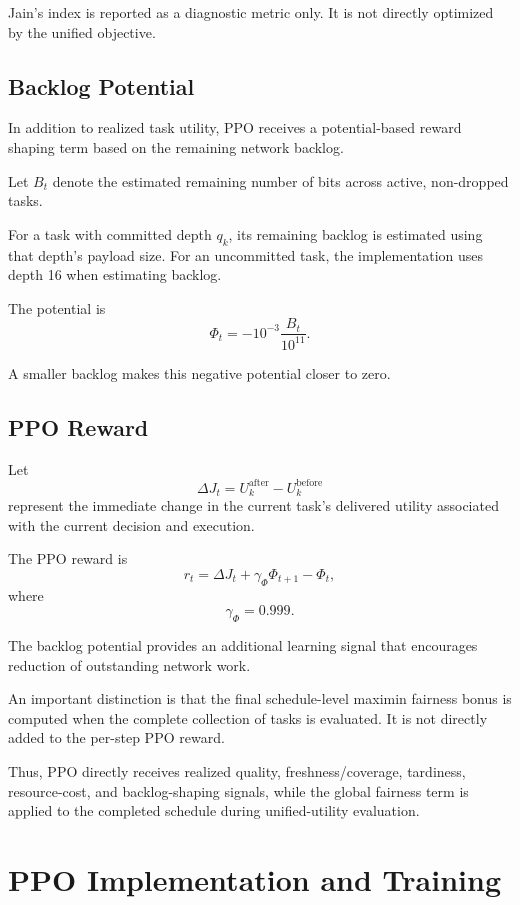 \documentclass[11pt]{article}
\begin{document}
Jain's index is reported as a diagnostic metric only. It is not directly
optimized by the unified objective.


\subsection{Backlog Potential}

In addition to realized task utility, PPO receives a potential-based reward
shaping term based on the remaining network backlog.

Let $B_t$ denote the estimated remaining number of bits across active,
non-dropped tasks.

For a task with committed depth $q_k$, its remaining backlog is estimated
using that depth's payload size. For an uncommitted task, the implementation
uses depth 16 when estimating backlog.

The potential is
\[
\Phi_t
=
-10^{-3}
\frac{B_t}{10^{11}}.
\]

A smaller backlog makes this negative potential closer to zero.


\subsection{PPO Reward}

Let
\[
\Delta J_t
=
U_k^{\mathrm{after}}
-
U_k^{\mathrm{before}}
\]
represent the immediate change in the current task's delivered utility
associated with the current decision and execution.

The PPO reward is
\[
r_t
=
\Delta J_t
+
\gamma_{\Phi}\Phi_{t+1}
-
\Phi_t,
\]
where
\[
\gamma_{\Phi}=0.999.
\]

The backlog potential provides an additional learning signal that encourages
reduction of outstanding network work.

An important distinction is that the final schedule-level maximin fairness
bonus is computed when the complete collection of tasks is evaluated. It is
not directly added to the per-step PPO reward.

Thus, PPO directly receives realized quality, freshness/coverage, tardiness,
resource-cost, and backlog-shaping signals, while the global fairness term is
applied to the completed schedule during unified-utility evaluation.


\section{PPO Implementation and Training}
\end{document}
